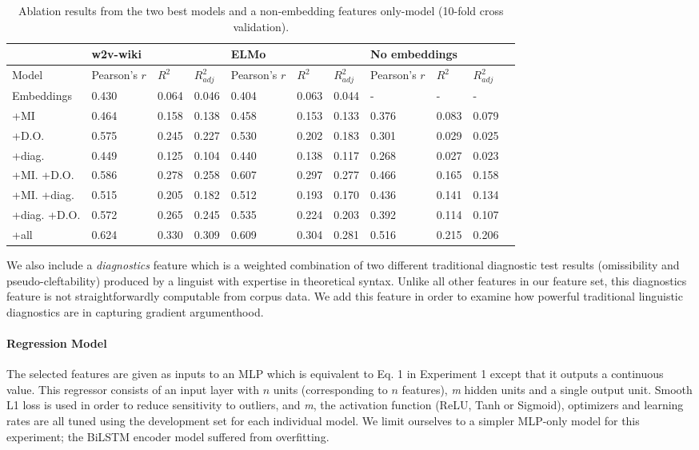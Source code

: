 \documentclass[letterpaper]{article} %
\begin{document}
\begin{table}[h]
\centering
\begin{tabular}{@{}lllllllllll@{}}
\toprule
& \multicolumn{3}{l}{w2v-wiki} & \multicolumn{3}{l}{ELMo} & \multicolumn{3}{l}{No embeddings}\\ \midrule
Model       & Pearson's $r$ & $R^2$ & $R^2_{adj}$ & Pearson's $r$ & $R^2$ & $R^2_{adj}$ & Pearson's $r$  & $R^2$ & $R^2_{adj}$  \\ \midrule
Embeddings &  0.430 & 0.064 & 0.046 \hspace{0.7cm} & 0.404 &  0.063 & 0.044 \hspace{0.7cm} & - & - & -\\
{} {} {} {} +MI & 0.464 & 0.158  & 0.138 & 0.458 &  0.153 & 0.133 & 0.376 & 0.083 & 0.079 \\
{} {} {} {} +D.O.  & 0.575 & 0.245 & 0.227 & 0.530 & 0.202 & 0.183 & 0.301 & 0.029 & 0.025\\
{} {} {} {} +diag. & 0.449 & 0.125 & 0.104 & 0.440 & 0.138 & 0.117 & 0.268 & 0.027 & 0.023 \\
{} {} {} {} +MI. +D.O.  & 0.586 & 0.278 & 0.258 & 0.607 & 0.297 & 0.277 & 0.466 & 0.165 & 0.158 \\
{} {} {} {} +MI. +diag. & 0.515 & 0.205 & 0.182 & 0.512 & 0.193 & 0.170 & 0.436 & 0.141 & 0.134  \\
{} {} {} {} +diag. +D.O. & 0.572 & 0.265 & 0.245 & 0.535 & 0.224 & 0.203 & 0.392 & 0.114 & 0.107 \\
{} {} {} {} +all & 0.624 & 0.330  & 0.309 & 0.609 & 0.304 & 0.281
&  0.516 & 0.215 & 0.206 \\
\bottomrule
\end{tabular}
\caption{Ablation results from the two best models and a non-embedding features only-model (10-fold cross validation).}
\label{ex2:ablation-2}
\end{table}

We also include a \textit{diagnostics} feature which is a weighted combination of two different traditional diagnostic test results (omissibility and pseudo-cleftability) produced by a linguist with expertise in theoretical syntax. Unlike all other features in our feature set, this diagnostics feature is not straightforwardly computable from corpus data. We add this feature in order to examine how powerful traditional linguistic diagnostics are in capturing gradient argumenthood.

\paragraph{Regression Model}
The selected features are given as inputs to an MLP which is equivalent to Eq. 1 in Experiment 1 except that it outputs a continuous value. This regressor consists of an input layer with $n$ units (corresponding to $n$ features), \textit{m} hidden units and a single output unit. Smooth L1 loss is used in order to reduce sensitivity to outliers, and \textit{m}, the activation function (ReLU, Tanh or Sigmoid), optimizers and learning rates are all tuned using the development set for each individual model. We limit ourselves to a simpler MLP-only model for this experiment; the BiLSTM encoder model suffered from overfitting.
\end{document}
